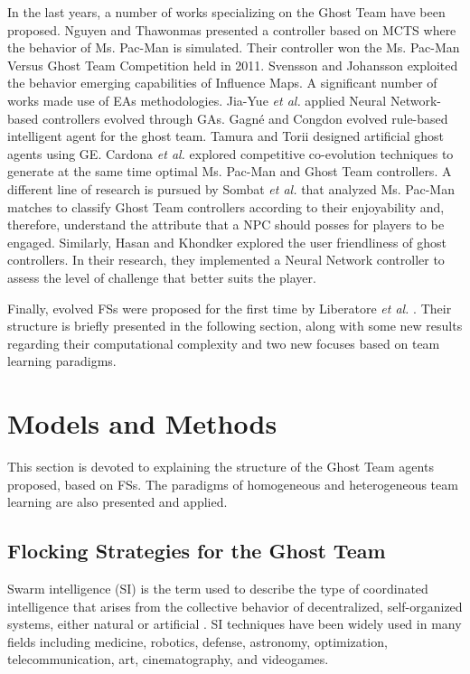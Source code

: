 \documentclass[journal]{IEEEtran}
\begin{document}
In the last years, a number of works specializing on the Ghost Team have been proposed. Nguyen and Thawonmas \cite{Nguyen2011,Nguyen2013} presented a controller based on MCTS where the behavior of Ms. Pac-Man is simulated. Their controller won the Ms. Pac-Man Versus Ghost Team Competition held in 2011. Svensson and Johansson \cite{Svensson2012} exploited the behavior emerging capabilities of Influence Maps. A significant number of works made use of EAs methodologies. Jia-Yue \emph{et al.} \cite{Jia-Yue11} applied Neural Network-based controllers evolved through GAs. Gagné and Congdon \cite{Gagne2012} evolved rule-based intelligent agent for the ghost team. Tamura and Torii \cite{Tamura2013} designed artificial ghost agents using GE. Cardona \textit{et al.} \cite{Cardona13} explored competitive co-evolution techniques to generate at the same time optimal Ms. Pac-Man and Ghost Team controllers. A different line of research is pursued by Sombat \textit{et al.} \cite{Sombat2012} that analyzed Ms. Pac-Man matches to classify Ghost Team controllers according to their enjoyability and, therefore, understand the attribute that a NPC should posses for players to be engaged. Similarly, Hasan and Khondker \cite{Hasan2013} explored the user friendliness of ghost controllers. In their research, they implemented a Neural Network controller to assess the level of challenge that better suits the player.

Finally, evolved FSs were proposed for the first time by Liberatore \emph{et al.} \cite{Liberatore2014}.  Their structure is briefly presented in the following section, along with some new results regarding their computational complexity and two new focuses based on team learning paradigms.

\section{Models and Methods}
\label{sec:ModelsMethods}
This section is devoted to explaining the structure of the Ghost Team agents proposed, based on FSs. The paradigms of homogeneous and heterogeneous team learning are also presented and applied. 

\subsection{Flocking Strategies for the Ghost Team}
Swarm intelligence (SI) is the term used to describe the type of coordinated intelligence that arises from the collective behavior of decentralized, self-organized systems, either natural or artificial \cite{BeniWang89}. SI techniques have been widely used in many fields including medicine, robotics, defense, astronomy, optimization, telecommunication, art, cinematography, and videogames.
\end{document}

